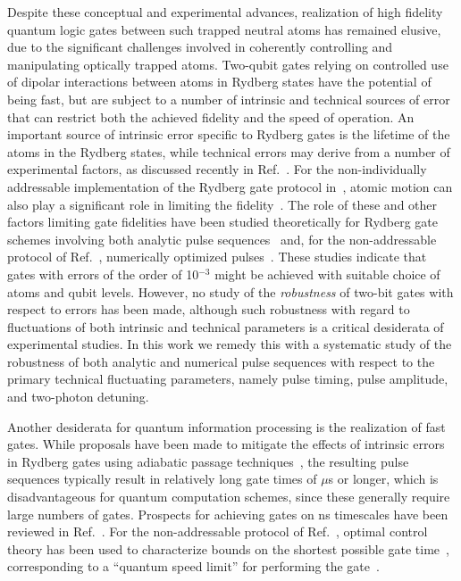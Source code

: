 Despite these conceptual and experimental advances, realization of high fidelity
quantum logic gates between such trapped neutral atoms has remained elusive, due
to the significant challenges involved in coherently controlling and
manipulating optically trapped atoms. Two-qubit gates relying on controlled use
of dipolar interactions between atoms in Rydberg states have the potential of
being fast, but are subject to a number of intrinsic and technical sources of
error that can restrict both the achieved fidelity and the speed of operation.  An
important source of intrinsic error specific to Rydberg gates is the lifetime of
the atoms in the Rydberg states, while technical errors may derive from a number
of experimental factors, as discussed recently in Ref.~\cite{zhang2012fidelity}. For
the non-individually addressable implementation of the Rydberg gate protocol
in~\cite{JakschPRL00}, atomic motion can also play a significant role in
limiting the fidelity~\cite{GoerzJPB11,murphy2011towards}.  The role of these
and other factors limiting gate fidelities have been studied theoretically for
Rydberg gate schemes involving both analytic pulse
sequences~\cite{brion2007implementing,zhang2012fidelity} and, for the
non-addressable protocol of Ref.~\cite{JakschPRL00}, numerically optimized
pulses~\cite{GoerzJPB11,murphy2011towards}. These studies indicate that gates
with errors of the order of 10$^{-3}$ might be achieved with suitable choice of
atoms and qubit levels.  However, no study of the \emph{robustness} of two-bit
gates with respect to errors has been made, although such robustness with regard
to fluctuations of both intrinsic and technical parameters is a critical
desiderata of experimental studies.  In this work we remedy this with
a systematic study of the robustness of both analytic and numerical pulse
sequences with respect to the primary technical fluctuating parameters, namely
pulse timing, pulse amplitude, and two-photon
detuning. 

Another desiderata for quantum information processing is the realization of fast
gates.  While proposals have been made to mitigate the effects of intrinsic
errors in Rydberg gates using adiabatic passage
techniques~\cite{gaubatz1990population}, the resulting pulse sequences typically
result in relatively long gate times of $\mu$s or
longer\cite{moller2008quantum,beterov2013quantum}, which is disadvantageous for
quantum computation schemes, since these generally require large numbers of gates.
Prospects for achieving gates on ns timescales have been reviewed
in Ref.~\cite{MuellerKochSpIssue11}. For the non-addressable protocol
of Ref.~\cite{JakschPRL00}, optimal control theory has been used to characterize
bounds on the shortest possible gate time~\cite{CanevaPRL09}, corresponding to
a ``quantum speed limit'' for performing the gate~\cite{GiovannettiPRA03}.

